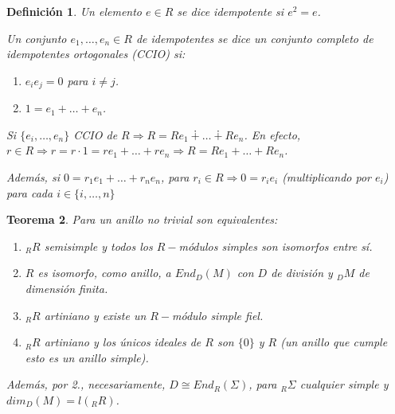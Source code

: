 \documentclass[11pt,a4paper]{article}
\theoremstyle{break}
\newtheorem{theorem}{Teorema}[section]
\newtheorem{definition}[theorem]{Definición}
\begin{document}
\begin{definition}
Un elemento $e \in R$ se dice idempotente si $e^{2} = e$.

Un conjunto $e_{1}, \dots, e_{n} \in R$ de idempotentes se dice un conjunto completo de idempotentes ortogonales (CCIO) si:
\begin{enumerate}
\item $e_{i}e_{j} = 0$ para $i \neq j$.
\item $1 = e_{1} + \dots + e_{n}$.
\end{enumerate}

Si $\{e_{i}, \dots, e_{n}\}$ CCIO de $R \Rightarrow R = Re_{1} \dotplus \dots \dotplus Re_{n}$. En efecto, $r \in R \Rightarrow r = r \cdot 1 = r e_{1} + \dots + re_{n} \Rightarrow R = Re_{1} + \dots + Re_{n}$.

Además, si $0 = r_{1}e_{1} + \dots + r_{n}e_{n}$, para $r_{i} \in R \Rightarrow 0 = r_{i}e_{i}$ (multiplicando por $e_{i}$) para cada $i \in \{i, \dots, n\}$
\end{definition}

\begin{theorem}
Para un anillo no trivial son equivalentes:
\begin{enumerate}
\item $_{R}R$ semisimple y todos los $R-$módulos simples son isomorfos entre sí.
\item $R$ es isomorfo, como anillo, a $End_{D}(M)$ con $D$ de división y $_{D}M$ de dimensión finita.
\item $_{R}R$ artiniano y existe un $R-$módulo simple fiel.
\item $_{R}R$ artiniano y los únicos ideales de $R$ son $\{0\}$ y $R$ (un anillo que cumple esto es un anillo simple).
\end{enumerate}
Además, por 2., necesariamente, $D \cong End_{R}(\Sigma)$, para $_{R}\Sigma$ cualquier simple y $dim_{D}(M) = l(_{R}R)$.
\end{theorem}
\end{document}
